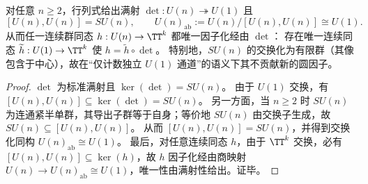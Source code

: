 \begin{proposition}\label{prop:cdim-global-phase-exhaustion}
对任意 \(n\ge 2\)，行列式给出满射
\(
\det:U(n)\twoheadrightarrow U(1)
\)
且
\[
[U(n),U(n)]=SU(n),\qquad
U(n)_{\mathrm{ab}}:=U(n)/[U(n),U(n)]\cong U(1).
\]
从而任一连续群同态 \(h:U(n)\to \TT^{k}\) 都唯一因子化经由 \(\det\)：
存在唯一连续同态 \(\widetilde h:U(1)\to \TT^{k}\) 使 \(h=\widetilde h\circ \det\)。
特别地，\(SU(n)\) 的交换化为有限群（其像包含于中心），故在“仅计数独立 \(U(1)\) 通道”的语义下其不贡献新的圆因子。
\end{proposition}
\begin{proof}
\(\det\) 为标准满射且 \(\ker(\det)=SU(n)\)。
由于 \(U(1)\) 交换，有 \([U(n),U(n)]\subseteq \ker(\det)=SU(n)\)。
另一方面，当 \(n\ge 2\) 时 \(SU(n)\) 为连通紧半单群，其导出子群等于自身；等价地 \(SU(n)\) 由交换子生成，故 \(SU(n)\subseteq [U(n),U(n)]\)。
从而 \([U(n),U(n)]=SU(n)\)，并得到交换化同构 \(U(n)_{\mathrm{ab}}\cong U(1)\)。
最后，对任意连续同态 \(h\)，由于 \(\TT^{k}\) 交换，必有 \([U(n),U(n)]\subseteq \ker(h)\)，故 \(h\) 因子化经由商映射 \(U(n)\to U(n)_{\mathrm{ab}}\cong U(1)\)，唯一性由满射性给出。证毕。
\end{proof}

\endinput

